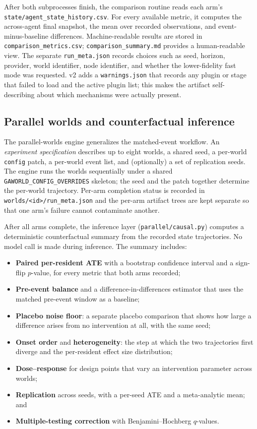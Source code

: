 After both subprocesses finish, the comparison routine reads each arm's
\texttt{state/agent\_state\_history.csv}.  For every available metric, it
computes the across-agent final snapshot, the mean over recorded observations,
and event-minus-baseline differences.  Machine-readable results are stored in
\texttt{comparison\_metrics.csv}; \texttt{comparison\_summary.md} provides a
human-readable view.  The separate \texttt{run\_meta.json} records choices
such as seed, horizon, provider, world identifier, node identifier, and
whether the lower-fidelity fast mode was requested.  v2 adds a
\texttt{warnings.json} that records any plugin or stage that failed to load
and the active plugin list; this makes the artifact self-describing about
which mechanisms were actually present.

\subsection{Parallel worlds and counterfactual inference}

The parallel-worlds engine generalizes the matched-event workflow.  An
\emph{experiment specification} describes up to eight worlds, a shared seed,
a per-world \texttt{config} patch, a per-world event list, and (optionally) a
set of replication seeds.  The engine runs the worlds sequentially under a
shared \texttt{GAWORLD\_CONFIG\_OVERRIDES} skeleton; the seed and the patch
together determine the per-world trajectory.  Per-arm completion status is
recorded in \texttt{worlds/<id>/run\_meta.json} and the per-arm artifact
trees are kept separate so that one arm's failure cannot contaminate another.

After all arms complete, the inference layer (\texttt{parallel/causal.py})
computes a deterministic counterfactual summary from the recorded state
trajectories.  No model call is made during inference.  The summary
includes:

\begin{itemize}[leftmargin=*]
  \item \textbf{Paired per-resident ATE} with a bootstrap confidence interval
  and a sign-flip $p$-value, for every metric that both arms recorded;
  \item \textbf{Pre-event balance} and a difference-in-differences estimator
  that uses the matched pre-event window as a baseline;
  \item \textbf{Placebo noise floor}: a separate placebo comparison that
  shows how large a difference arises from no intervention at all, with the
  same seed;
  \item \textbf{Onset order} and \textbf{heterogeneity}: the step at which
  the two trajectories first diverge and the per-resident effect size
  distribution;
  \item \textbf{Dose--response} for design points that vary an intervention
  parameter across worlds;
  \item \textbf{Replication} across seeds, with a per-seed ATE and a
  meta-analytic mean; and
  \item \textbf{Multiple-testing correction} with Benjamini--Hochberg
  $q$-values.
\end{itemize}

